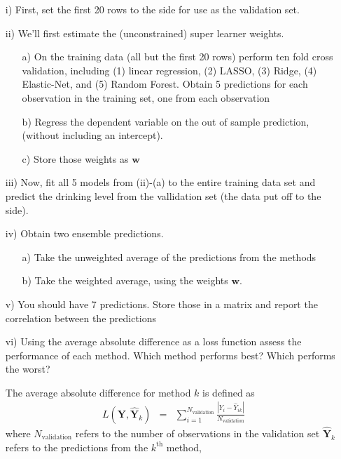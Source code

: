 \documentclass[letterpaper,12pt]{article}
\numberwithin{equation}{section}
\numberwithin{equation}{section}
\begin{document}
\begin{itemize}
\item[i)] First, set the first 20 rows to the side for use as the validation set.
\item[ii)] We'll first estimate the (unconstrained) super learner weights.
\begin{itemize}
\item[a)] On the training data (all but the first 20 rows) perform ten fold cross validation, including (1) linear regression, (2) LASSO, (3) Ridge, (4) Elastic-Net, and (5) Random Forest.  Obtain 5 predictions for each observation in the training set, one from each observation
\item[b)] Regress the dependent variable on the out of sample prediction, (without including an intercept).
\item[c)] Store those weights as $\boldsymbol{w}$
\end{itemize}
\item[iii)] Now, fit all 5 models from (ii)-(a) to the entire training data set and predict the drinking level from the vallidation set (the data put off to the side).
\item[iv)]   Obtain two ensemble predictions.
\begin{itemize}
\item[a)] Take the unweighted average of the predictions from the methods
\item[b)] Take the weighted average, using the weights $\boldsymbol{w}$.
\end{itemize}
\item[v)] You should have 7 predictions. Store those in a matrix and report the correlation between the predictions
\item[vi)] Using the average absolute difference as a loss function assess the performance of each method.  Which method performs best?  Which performs the worst?

\noindent The average absolute difference for method $k$ is defined as
\begin{eqnarray}
L(\boldsymbol{Y}, \widehat{\boldsymbol{Y}}_{k}) & = & \sum_{i=1}^{N_{\text{validation}}} \frac{|Y_{i} - \widehat{Y}_{ik}| }{ N_{\text{validation}} }\nonumber
\end{eqnarray}
where $N_{\text{validation}}$ refers to the number of observations in the validation set $\widehat{\boldsymbol{Y}}_{k}$ refers to the predictions from the $k^{\text{th}}$ method,


\end{itemize}
\end{document}
